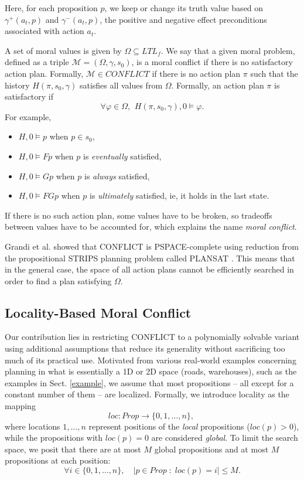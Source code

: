 \documentclass[a4paper,fleqn]{cas-dc}
\begin{document}
Here, for each proposition $p$, we keep or change its truth value based on \( \gamma^+(a_t, p) \) and \( \gamma^-(a_t, p) \), the positive and negative effect preconditions associated with action \( a_t \).

A set of moral values is given by $\Omega\subseteq LTL_f$.
We say that a given moral problem, defined as a triple $\mathcal{M}=(\Omega, \gamma, s_0)$, 
is a moral conflict if there is no satisfactory action plan. Formally, $\mathcal{M}\in CONFLICT$
if there is no action plan $\pi$ such that the history $H(\pi, s_0, \gamma)$ satisfies all values
from $\Omega$. Formally, an action plan $\pi$ is satisfactory if
\begin{equation}
\forall \varphi \in \Omega, \, \ H(\pi, s_0, \gamma), 0 \models \varphi.
\end{equation}
For example,
\begin{itemize}
    \item $H, 0\models p$ when $p\in s_0$,
    \item $H, 0\models Fp$ when $p$ is {\it eventually} satisfied,
    \item $H, 0\models Gp$ when $p$ is {\it always} satisfied,
    \item $H, 0\models FGp$ when $p$ is {\it ultimately} satisfied, ie, it holds in the last state.
\end{itemize}
If there is no such action plan, some values have to be broken, so tradeoffs between values have to be accounted for, which explains the name {\it moral conflict}.

 Grandi et al. \cite{grandi2022logic} showed that CONFLICT is PSPACE-complete using reduction from the propositional STRIPS planning problem called PLANSAT \cite{BYLANDER1994165}. This means that in the general case,
 the space of all action plans cannot be efficiently searched in order to find a plan satisfying $\Omega$.

\subsection{Locality-Based Moral Conflict}\label{aa}

Our contribution lies in restricting CONFLICT to a polynomially solvable variant using additional assumptions that reduce its generality without sacrificing too much of its practical use. Motivated from various real-world examples concerning planning in what is essentially a 1D or 2D space (roads, warehouses), such as the examples in Sect. \ref{example}, we assume that most propositions -- all except for a constant number of them -- are localized. Formally, we introduce locality as the mapping 
\begin{equation}
    loc: Prop \to \{0,1, \dots, n\},\  
\end{equation}
where locations $1, \dots, n$ represent positions of the {\it local} propositions ($loc(p)>0$),
while the propositions with $loc(p)=0$ are considered {\it global}.
To limit the search space, we posit that there are at most $M$ global propositions and at most $M$
propositions at each position:
\begin{equation}
    \forall i\in\{0,1,\dots,n\},\quad |p\in Prop \; : \; loc(p)=i|\le M.
\end{equation}
\end{document}
